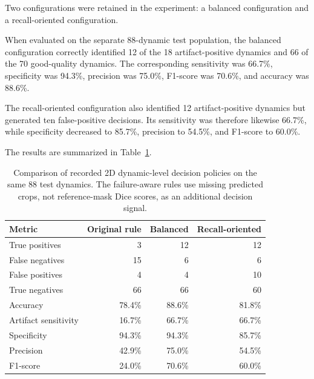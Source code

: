 Two configurations were retained in the experiment: a balanced configuration and a recall-oriented configuration.

When evaluated on the separate 88-dynamic test population, the balanced configuration correctly identified 12 of the 18 artifact-positive dynamics and 66 of the 70 good-quality dynamics. The corresponding sensitivity was 66.7\%, specificity was 94.3\%, precision was 75.0\%, F1-score was 70.6\%, and accuracy was 88.6\%.

The recall-oriented configuration also identified 12 artifact-positive dynamics but generated ten false-positive decisions. Its sensitivity was therefore likewise 66.7\%, while specificity decreased to 85.7\%, precision to 54.5\%, and F1-score to 60.0\%.

The results are summarized in Table~\ref{tab:results_failure_aware_policies}.

\begin{table}[htbp]
\centering
\caption{Comparison of recorded 2D dynamic-level decision policies on the same 88 test dynamics. The failure-aware rules use missing predicted crops, not reference-mask Dice scores, as an additional decision signal.}
\label{tab:results_failure_aware_policies}
\begin{tabular}{lrrr}
\hline
Metric & Original rule & Balanced & Recall-oriented \\
\hline
True positives & 3 & 12 & 12 \\
False negatives & 15 & 6 & 6 \\
False positives & 4 & 4 & 10 \\
True negatives & 66 & 66 & 60 \\
Accuracy & 78.4\% & 88.6\% & 81.8\% \\
Artifact sensitivity & 16.7\% & 66.7\% & 66.7\% \\
Specificity & 94.3\% & 94.3\% & 85.7\% \\
Precision & 42.9\% & 75.0\% & 54.5\% \\
F1-score & 24.0\% & 70.6\% & 60.0\% \\
\hline
\end{tabular}
\end{table}

